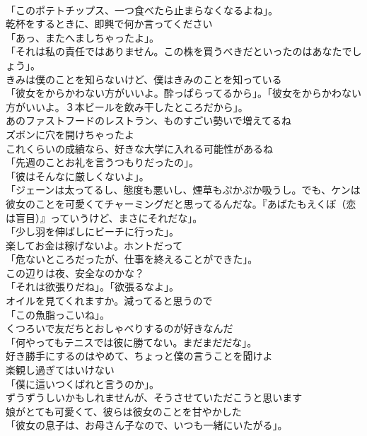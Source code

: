 \documentclass[8pt]{extreport}
\begin{document}
\begin{CJK}{UTF8}{min}
\\	「このポテトチップス、一つ食べたら止まらなくなるよね」。	
\\	乾杯をするときに、即興で何か言ってください	
\\	「あっ、またへましちゃったよ」。	
\\	「それは私の責任ではありません。この株を買うべきだといったのはあなたでしょう」。	
\\	きみは僕のことを知らないけど、僕はきみのことを知っている	
\\	「彼女をからかわない方がいいよ。酔っぱらってるから」。「彼女をからかわない方がいいよ。３本ビールを飲み干したところだから」。	
\\	あのファストフードのレストラン、ものすごい勢いで増えてるね	
\\	ズボンに穴を開けちゃったよ	
\\	これくらいの成績なら、好きな大学に入れる可能性があるね	
\\	「先週のことお礼を言うつもりだったの」。	
\\	「彼はそんなに厳しくないよ」。	
\\	「ジェーンは太ってるし、態度も悪いし、煙草もぷかぷか吸うし。でも、ケンは彼女のことを可愛くてチャーミングだと思ってるんだな。『あばたもえくぼ（恋は盲目）』っていうけど、まさにそれだな」。	
\\	「少し羽を伸ばしにビーチに行った」。	
\\	楽してお金は稼げないよ。ホントだって	
\\	「危ないところだったが、仕事を終えることができた」。	
\\	この辺りは夜、安全なのかな？	
\\	「それは欲張りだね」。「欲張るなよ」。	
\\	オイルを見てくれますか。減ってると思うので	
\\	「この魚脂っこいね」。	
\\	くつろいで友だちとおしゃべりするのが好きなんだ	
\\	「何やってもテニスでは彼に勝てない。まだまだだな」。	
\\	好き勝手にするのはやめて、ちょっと僕の言うことを聞けよ	
\\	楽観し過ぎてはいけない	
\\	「僕に這いつくばれと言うのか」。	
\\	ずうずうしいかもしれませんが、そうさせていただこうと思います	
\\	娘がとても可愛くて、彼らは彼女のことを甘やかした	
\\	「彼女の息子は、お母さん子なので、いつも一緒にいたがる」。	

\end{CJK}
\end{document}
